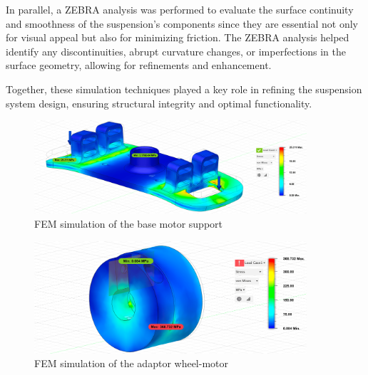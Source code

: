 \documentclass[11pt]{article}
\begin{document}
In parallel, a ZEBRA analysis was performed to evaluate the surface continuity and smoothness of the suspension's components since they are essential not only for visual appeal but also for minimizing friction. The ZEBRA analysis helped identify any discontinuities, abrupt curvature changes, or imperfections in the surface geometry, allowing for refinements and enhancement.

Together, these simulation techniques played a key role in refining the suspension system design, ensuring structural integrity and optimal functionality.

\begin{figure}[H]
    \centering
    \includegraphics[width=0.9\textwidth]{images/FEM/baseMotorSupport.png}
    \caption{FEM simulation of the base motor support}
    \label{fig:fem_base_motor_support}
\end{figure}

\begin{figure}[H]
    \centering
    \includegraphics[width=0.9\textwidth]{images/FEM/adaptor.png}
    \caption{FEM simulation of the adaptor wheel-motor}
    \label{fig:fem_adaptor_wheel_motor}
\end{figure}
\end{document}
